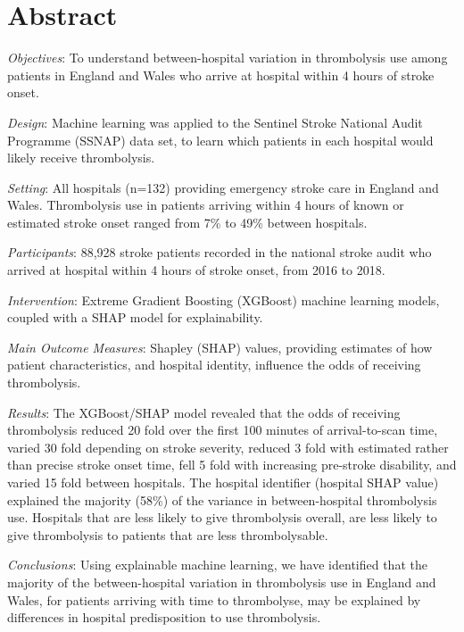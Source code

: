 \section*{Abstract}

\emph{Objectives}: To understand between-hospital variation in thrombolysis use among patients in England and Wales who arrive at hospital within 4 hours of stroke onset.

\emph{Design}: Machine learning was applied to the Sentinel Stroke National Audit Programme (SSNAP)  data set, to learn which patients in each hospital would likely receive thrombolysis.

\emph{Setting}: All hospitals (n=132) providing emergency stroke care in England and Wales. Thrombolysis use in patients arriving within 4 hours of known or estimated stroke onset ranged from 7\% to 49\% between hospitals.

\emph{Participants}: 88,928 stroke patients recorded in the national stroke audit who arrived at hospital within 4 hours of stroke onset, from 2016 to 2018.

\emph{Intervention}: Extreme Gradient Boosting (XGBoost) machine learning models, coupled with a SHAP model for explainability.

\emph{Main Outcome Measures}: Shapley (SHAP) values, providing estimates of how patient characteristics, and hospital identity, influence the odds of receiving thrombolysis.

\emph{Results}: The XGBoost/SHAP model revealed that the odds of receiving thrombolysis reduced 20 fold over the first 100 minutes of arrival-to-scan time, varied 30 fold depending on stroke severity, reduced 3 fold with estimated rather than precise stroke onset time, fell 5 fold with increasing pre-stroke disability, and varied 15 fold between hospitals. The hospital identifier (hospital SHAP value) explained the majority (58\%) of the variance in between-hospital thrombolysis use. Hospitals that are less likely to give thrombolysis overall, are less likely to give thrombolysis to patients that are less thrombolysable.%

\emph{Conclusions}: Using explainable machine learning, we have identified that the majority of the between-hospital variation in thrombolysis use in England and Wales, for patients arriving with time to thrombolyse, may be explained by differences in hospital predisposition to use thrombolysis.